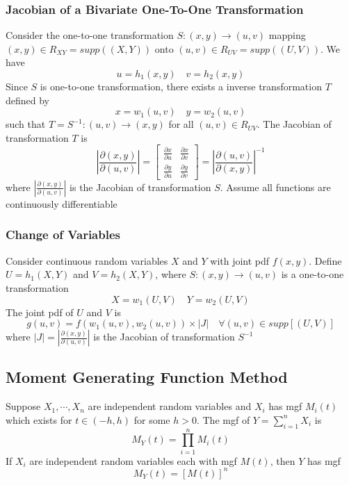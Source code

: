 \documentclass[11pt]{article}
\newcommand{\cv}[1]{\begin{bmatrix} #1 \end{bmatrix}}
\begin{document}
\subsubsection{Jacobian of a Bivariate One-To-One Transformation}
Consider the one-to-one transformation $S:(x,y)\rightarrow(u,v)$ mapping $(x,y)\in R_{XY}=supp((X,Y))$ onto 
$(u,v)\in R_{UV}=supp((U,V))$. We have 
\[u=h_1(x,y)\quad v=h_2(x,y)\]
Since $S$ is one-to-one transformation, there exists a inverse transformation $T$ defined by 
\[x=w_1(u,v)\quad y=w_2(u,v)\]
such that $T = S^{-1}:(u,v)\rightarrow(x,y)$ for all $(u,v)\in R_{UV}$. The Jacobian of transformation $T$ is 
\[\left|\frac{\partial(x,y)}{\partial(u,v)}\right| = \cv{\frac{\partial x}{\partial u} &\frac{\partial x}{\partial v}\\\frac{\partial y}{\partial u} &\frac{\partial y}{\partial v}} = \left|\frac{\partial (u,v)}{\partial(x,y)}\right|^{-1}\]
where $\left|\frac{\partial(x,y)}{\partial(u,v)}\right|$ is the Jacobian of transformation $S$. Assume all functions are continuously differentiable
\subsubsection{Change of Variables}
Consider continuous random variables $X$ and $Y$ with joint pdf $f(x,y)$. Define $U = h_1(X,Y)$ and $V=h_2(X,Y)$, where 
$S:(x,y)\rightarrow(u,v)$ is a one-to-one transformation 
\[X = w_1(U,V)\quad Y=w_2(U,V)\]
The joint pdf of $U$ and $V$ is
\[g(u,v) = f(w_1(u,v),w_2(u,v))\times |J|\quad \forall (u,v)\in supp[(U,V)]\] 
where $|J|=\left|\frac{\partial(x,y)}{\partial(u,v)}\right|$ is the Jacobian of transformation $S^{-1}$
\subsection{Moment Generating Function Method}
Suppose $X_1,\cdots,X_n$ are independent random variables and $X_i$ has mgf $M_i(t)$ which exists for 
$t\in(-h,h)$ for some $h>0$. The mgf of $Y=\sum_{i=1}^{n}X_i$ is
\[M_Y(t) = \prod_{i=1}^{n}M_i(t)\]
If $X_i$ are independent random variables each with mgf $M(t)$, then $Y$ has mgf 
\[M_Y(t) = [M(t)]^n\]
\end{document}

